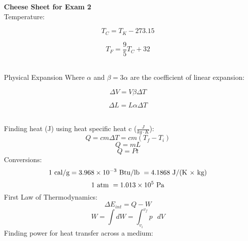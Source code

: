 \documentclass[11pt]{article}
\begin{document}
    \noindent \textbf{Cheese Sheet for Exam 2}%
    \\ \noindent \newline Temperature:


        \begin{minipage}{0.46\textwidth}
            \begin{equation}
                T_C = T_K - 273.15 \tag{Celsius}
            \end{equation}
        \end{minipage}
        \begin{minipage}{0.5\textwidth}
            \begin{equation}
                T_F = \frac{9}{5}T_C + 32 \tag{Fahrenheit}
            \end{equation}
        \end{minipage}

    \noindent \\ Physical Expansion Where $\alpha$ and $ \beta = 3\alpha$ are the coefficient of linear expansion:

    \begin{minipage}{0.46\textwidth}

        \begin{equation}
            \Delta V = V \beta \Delta T \tag{volume expansion}
        \end{equation}
    \end{minipage}
    \begin{minipage}{0.5\textwidth}
        \begin{equation}
            \Delta L = L \alpha \Delta T \tag{linear expansion}
        \end{equation}
    \end{minipage}
    
    \noindent \\ Finding heat (J) using heat specific heat c ($\frac{J}{kg \cdot K}$):
    \begin{equation}
        Q = cm \Delta T = cm(T_f - T_i) \tag{specific heat}
    \end{equation}
    \begin{equation}
        Q = mL \tag{latent heat}
    \end{equation}
    \begin{equation}
        Q = Pt \tag{power}
    \end{equation}
    \noindent Conversions:
    \begin{equation}
        1 \text{ cal/g} = 3.968 \times 10^{-3} \text{ Btu/lb }= 4.1868 \text{ J/(K $\times$ kg)} \notag
    \end{equation}
    \begin{equation}
        1 \text{ atm } = 1.013 \times 10^5 \text{ Pa} \notag
    \end{equation}
    First Law of Thermodynamics:
    \begin{equation}
        \Delta E_{int} = Q - W \tag{first law}
    \end{equation}
    \begin{equation}
        W = \int dW = \int_{v_i}^{v_f} p \text{ } dV \tag{work}
    \end{equation}
    Finding power for heat transfer across a medium:
\end{document}
